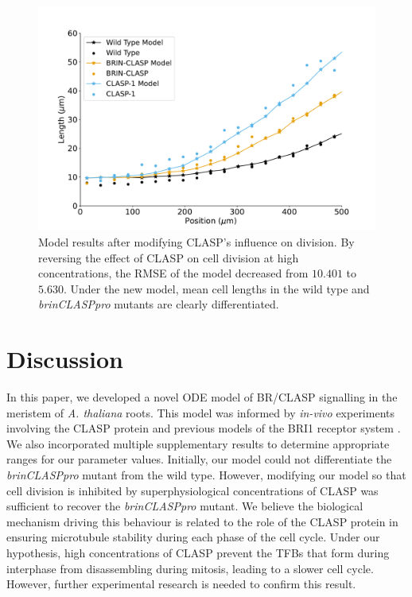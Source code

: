 \documentclass[referee,pdflatex,sn-mathphys-num]{sn-jnl}
\begin{document}
\begin{figure}
  \centering
  \includegraphics[width=\textwidth]{column-modified-fit.pdf}
  \caption{Model results after modifying CLASP's influence on division.
  By reversing the effect of CLASP on cell division at high concentrations, the RMSE of the model decreased from $10.401$ to $5.630$.
Under the new model, mean cell lengths in the wild type and \emph{brinCLASPpro} mutants are clearly differentiated. }
  \label{column-modified-fit}
\end{figure}

 
\section*{Discussion}\label{sec12}

In this paper, we developed a novel ODE model of BR/CLASP signalling in the meristem of \emph{A. thaliana} roots.
This model was informed by \emph{in-vivo} experiments involving the CLASP protein \cite{ambrose2011, ruan2018, halat2022} and previous models of the BRI1 receptor system \cite{vanesse2012}.
We also incorporated multiple supplementary results \cite{wang2001, cano-delgado2004} to determine appropriate ranges for our parameter values.
Initially, our model could not differentiate the \emph{brinCLASPpro} mutant from the wild type.
However, modifying our model so that cell division is inhibited by superphysiological concentrations of CLASP was sufficient to recover the \emph{brinCLASPpro} mutant.
We believe the biological mechanism driving this behaviour is related to the role of the CLASP protein in ensuring microtubule stability during each phase of the cell cycle.
Under our hypothesis, high concentrations of CLASP prevent the TFBs that form during interphase from disassembling during mitosis, leading to a slower cell cycle.
However, further experimental research is needed to confirm this result.
\end{document}
